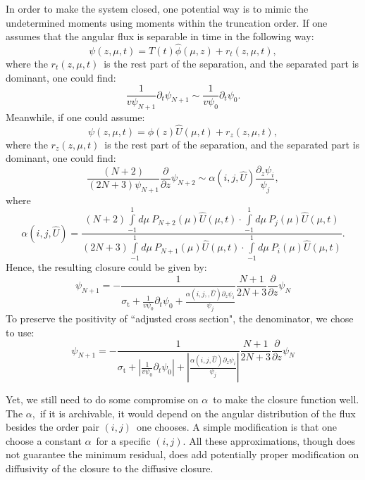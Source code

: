 \documentclass[review]{elsarticle}
\newcommand{\ppz}{\frac{\partial}{\partial z}}
\newcommand{\psii}[1]{\psi_\ensuremath{{#1}}}
\begin{document}
In order to make the system closed, one potential way is to mimic the undetermined moments using moments within the truncation order. If one assumes that the angular flux is separable in time in the following way:
\begin{equation}\label{sep1}
\psi(z,\mu,t)=T(t)\hat{\phi}(\mu,z)+r_t(z,\mu,t),
\end{equation}
where the $r_t(z,\mu,t)$~is the rest part of the separation, and the separated part is dominant, one could find:
\begin{equation}
\frac{1}{v\psii{N+1}}\partial_t\psii{N+1}\sim\frac{1}{v\psii{0}}\partial_t\psii{0}.
\end{equation}
Meanwhile, if one could assume:
\begin{equation}\label{sep2}
\psi(z,\mu,t)=\phi(z)\hat{U}(\mu,t)+r_z(z,\mu,t),
\end{equation}
where the $r_z(z,\mu,t)$~is the rest part of the separation, and the separated part is dominant, one could find:
\begin{equation}
\frac{(N+2)}{(2N+3)\psii{N+1}}\ppz\psii{N+2}\sim\alpha(i,j,\hat{U})\frac{\partial_z\psii{i}}{\psii{j}},
\end{equation}
where
\begin{equation}
\alpha(i,j,\hat{U})=\frac{(N+2)\displaystyle\int\limits_{-1}^1d\mu~P_{N+2}(\mu)\hat{U}(\mu,t)\cdot\int\limits_{-1}^1d\mu~P_{j}(\mu)\hat{U}(\mu,t)}{(2N+3)\displaystyle\int\limits_{-1}^1d\mu~P_{N+1}(\mu)\hat{U}(\mu,t)\cdot\int\limits_{-1}^1d\mu~P_{i}(\mu)\hat{U}(\mu,t)}.
\end{equation}
Hence, the resulting closure could be given by:
\begin{equation}\label{closure}
\psii{N+1}=-\frac{1}{\sigma_\mathrm{t}+\displaystyle\frac{1}{v\psii{0}}\partial_t\psii{0}+\frac{\alpha(i,j,,\hat{U})\partial_z\psii{i}}{\psii{j}}}\frac{N+1}{2N+3}\ppz\psii{N}
\end{equation}
To preserve the positivity of ``adjusted cross section", the denominator, we chose to use:
\begin{equation}\label{closure2}
\psii{N+1}=-\frac{1}{\sigma_\mathrm{t}+\displaystyle|\frac{1}{v\psii{0}}\partial_t\psii{0}|+|\frac{\alpha(i,j,\hat{U})\partial_z\psii{i}}{\psii{j}}|}\frac{N+1}{2N+3}\ppz\psii{N}
\end{equation}

Yet, we still need to do some compromise on $\alpha$~to make the closure function well. The $\alpha$,~if it is archivable, it would depend on the angular distribution of the flux besides the order pair $(i,j)$~one chooses. A simple modification is that one choose a constant $\alpha$~for a specific $(i,j)$. All these approximations, though does not guarantee the minimum residual, does add potentially proper modification on diffusivity of the closure to the diffusive closure.
\end{document}
